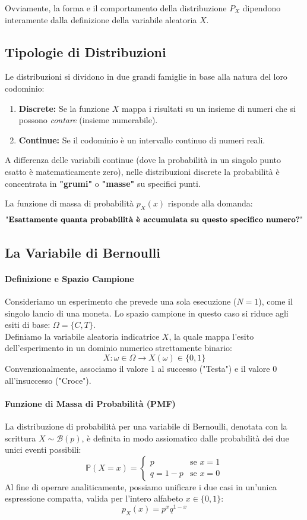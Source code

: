 Ovviamente, la forma e il comportamento della distribuzione $P_X$ dipendono interamente dalla definizione della variabile aleatoria $X$.

\subsection{Tipologie di Distribuzioni}

Le distribuzioni si dividono in due grandi famiglie in base alla natura del loro codominio:

\begin{enumerate}
    \item \textbf{Discrete:} Se la funzione $X$ mappa i risultati su un insieme di numeri che si possono \textit{contare} (insieme numerabile).
    \item \textbf{Continue:} Se il codominio è un intervallo continuo di numeri reali.
\end{enumerate}

A differenza delle variabili continue (dove la probabilità in un singolo punto esatto è matematicamente zero), nelle distribuzioni discrete la probabilità è concentrata in \textbf{"grumi"} o \textbf{"masse"} su specifici punti.

La funzione di massa di probabilità $p_X(x)$ risponde alla domanda:
\[
\text{"\textbf{Esattamente quanta probabilità è accumulata su questo specifico numero?}"}
\]

\subsection{La Variabile di Bernoulli}

\paragraph{Definizione e Spazio Campione}
Consideriamo un esperimento che prevede una sola esecuzione ($N = 1$), come il singolo lancio di una moneta. Lo spazio campione in questo caso si riduce agli esiti di base: $\Omega = \{C, T\}$.
\\Definiamo la variabile aleatoria indicatrice $X$, la quale mappa l'esito dell'esperimento in un dominio numerico strettamente binario:
\[ X: \omega \in \Omega \longrightarrow X(\omega) \in \{0, 1\} \]
Convenzionalmente, associamo il valore $1$ al successo ("Testa") e il valore $0$ all'insuccesso ("Croce").

\paragraph{Funzione di Massa di Probabilità (PMF)}
La distribuzione di probabilità per una variabile di Bernoulli, denotata con la scrittura $X \sim \mathcal{B}(p)$, è definita in modo assiomatico dalle probabilità dei due unici eventi possibili:
\[ 
\mathbb{P}(X = x) = 
\begin{cases} 
p & \text{se } x = 1 \\ 
q = 1 - p & \text{se } x = 0 
\end{cases} 
\]
Al fine di operare analiticamente, possiamo unificare i due casi in un'unica espressione compatta, valida per l'intero alfabeto $x \in \{0, 1\}$:
\[ p_X(x) = p^x q^{1-x} \]

